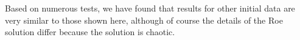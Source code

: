 \documentclass{article}
\begin{document}
Based on numerous tests, we have found that results for other initial data
are very similar to those shown here, although of course the details
of the Roe solution differ because the solution is chaotic.

\begin{figure}
  \begin{centering}


\end{centering}
\end{figure}
\end{document}

